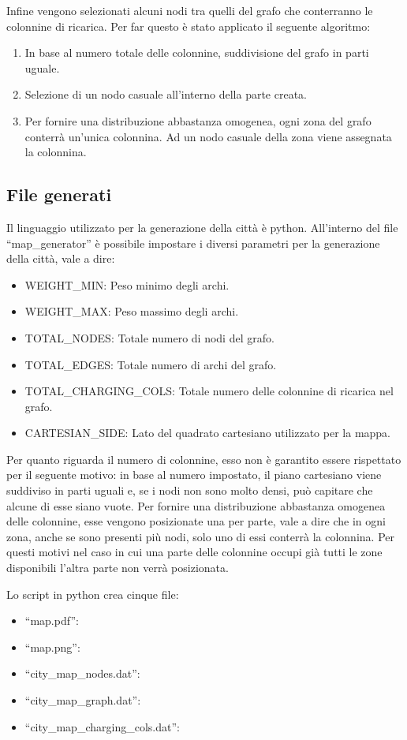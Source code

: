 Infine vengono selezionati alcuni nodi tra quelli del grafo che conterranno le colonnine di ricarica. Per far questo è stato applicato il seguente algoritmo:
\begin{enumerate}
	\item In base al numero totale delle colonnine, suddivisione del grafo in parti uguale.
	\item Selezione di un nodo casuale all'interno della parte creata.
	\item Per fornire una distribuzione abbastanza omogenea, ogni zona del grafo conterrà un'unica colonnina. Ad un nodo casuale della zona viene assegnata la colonnina.
\end{enumerate}

\subsection{File generati}
Il linguaggio utilizzato per la generazione della città è python. All'interno del file ``map\_generator'' è possibile impostare i diversi parametri per la generazione della città, vale a dire:
\begin{itemize}
\item WEIGHT\_MIN: Peso minimo degli archi.
\item WEIGHT\_MAX:  Peso massimo degli archi.
\item TOTAL\_NODES: Totale numero di nodi del grafo.
\item TOTAL\_EDGES:  Totale numero di archi del grafo.
\item TOTAL\_CHARGING\_COLS:  Totale numero delle colonnine di ricarica nel grafo.
\item CARTESIAN\_SIDE:  Lato del quadrato cartesiano utilizzato per la mappa.
\end{itemize}

Per quanto riguarda il numero di colonnine, esso non è garantito essere rispettato per il seguente motivo: in base al numero impostato, il piano cartesiano viene suddiviso in parti uguali e, se i nodi non sono molto densi, può capitare che alcune di esse siano vuote. Per fornire una distribuzione abbastanza omogenea delle colonnine, esse vengono posizionate una per parte, vale a dire che in ogni zona, anche se sono presenti più nodi, solo uno di essi conterrà la colonnina. Per questi motivi nel caso in cui una parte delle colonnine occupi già tutti le zone disponibili l'altra parte non verrà posizionata.

Lo script in python crea cinque file:
\begin{itemize}
	\item ``map.pdf'': 
	\item ``map.png'':
	\item ``city\_map\_nodes.dat'':
	\item ``city\_map\_graph.dat'':
	\item ``city\_map\_charging\_cols.dat'':
\end{itemize}

